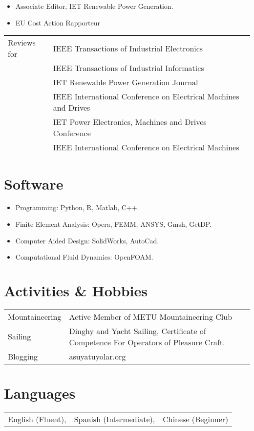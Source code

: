 \documentclass[a4paper,12pt]{article}
\begin{document}
\begin{itemize}
\item Associate Editor, IET Renewable Power Generation.
\item EU Cost Action Rapporteur
\end{itemize}

\begin{tabular}{ll}
Reviews for & IEEE Transactions of Industrial Electronics \\
& IEEE Transactions of Industrial Informatics \\
& IET Renewable Power Generation Journal \\
& IEEE International Conference on Electrical Machines and Drives \\
& IET Power Electronics, Machines and Drives Conference \\
& IEEE International Conference on Electrical Machines\\
\end{tabular}


\section{Software}
\begin{itemize}
\item Programming: Python, R, Matlab, C++.
\item Finite Element Analysis: Opera, FEMM, ANSYS, Gmsh, GetDP.
\item Computer Aided Design: SolidWorks, AutoCad.
\item Computational Fluid Dynamics: OpenFOAM.
\end{itemize}

\section{Activities \& Hobbies}
\begin{tabular}{ll}
Mountaineering & Active Member of METU Mountaineering Club\\
Sailing & Dinghy and Yacht Sailing, Certificate of Competence For Operators of Pleasure Craft. \\
Blogging & asuyatuyolar.org\\
\end{tabular}

\section{Languages}
\begin{tabular}{lll} 
English (Fluent), & Spanish (Intermediate), & Chinese (Beginner)
\end{tabular}
\end{document}
